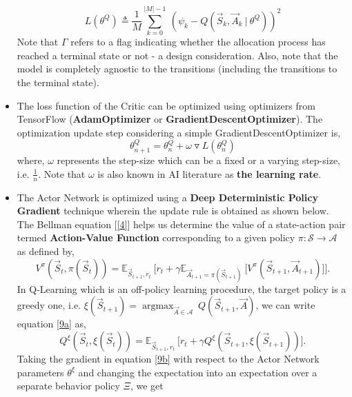 \documentclass{article}
\DeclareMathOperator*{\argmax}{argmax}
\begin{document}
\begin{itemize}
    \begin{equation}
        L(\theta^{Q}) \triangleq \frac{1}{M} \sum_{k=0}^{|M|-1}\ (\psi_k - Q(\vec{S}_{k}, \vec{A}_{k}\ |\ \theta^{Q}))^2
    \end{equation}
    Note that $\Gamma$ refers to a flag indicating whether the allocation process has reached a terminal state or not - a design consideration. Also, note that the model is completely agnostic to the transitions (including the transitions to the terminal state).
    \item The loss function of the Critic can be optimized using optimizers from TensorFlow (\textbf{AdamOptimizer} or \textbf{GradientDescentOptimizer}). The optimization update step considering a simple GradientDescentOptimizer is,
    \begin{equation}
        \theta^{Q}_{n+1} = \theta^{Q}_{n} + \omega \triangledown L(\theta^{Q}_{n})
    \end{equation}
    where, $\omega$ represents the step-size which can be a fixed or a varying step-size, i.e. $\frac{1}{n}$. Note that $\omega$ is also known in AI literature as \textbf{the learning rate}.
    \item The Actor Network is optimized using a \textbf{Deep Deterministic Policy Gradient} technique wherein the update rule is obtained as shown below.
    \\The Bellman equation [\ref{4}] helps us determine the value of a state-action pair termed \textbf{Action-Value Function} corresponding to a given policy $\pi: \mathcal{S} \rightarrow \mathcal{A}$ as defined by,
    \begin{equation}\label{9a}
        V^{\pi}(\vec{S}_t, \pi(\vec{S}_t)) = \mathbb{E}_{\vec{S}_{t+1}, r_{t}}\ \Big[r_t + \gamma \mathbb{E}_{\vec{A}_{t+1} = \pi(\vec{S}_{t+1})}\ \Big[ V^{\pi}(\vec{S}_{t+1}, \vec{A}_{t+1})\Big]\Big].
    \end{equation}
    In Q-Learning which is an off-policy learning procedure, the target policy is a greedy one, i.e. $\xi(\vec{S}_{t+1}) = \argmax_{\vec{A} \in \mathcal{A}}\ Q(\vec{S}_{t+1}, \vec{A})$, we can write equation \eqref{9a} as,
    \begin{equation}\label{9b}
        Q^{\xi}(\vec{S}_t, \xi(\vec{S}_t)) = \mathbb{E}_{\vec{S}_{t+1}, r_{t}}\ \Big[r_t + \gamma Q^{\xi}(\vec{S}_{t+1}, \xi(\vec{S}_{t+1}))\Big].
    \end{equation}
    Taking the gradient in equation \eqref{9b} with respect to the Actor Network parameters $\theta^{\xi}$ and changing the expectation into an expectation over a separate behavior policy $\Xi$, we get

\end{itemize}
\end{document}

